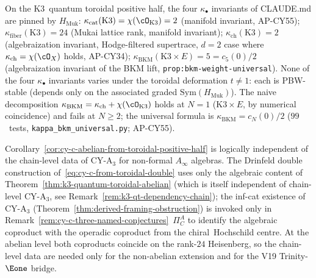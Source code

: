 \begin{remark}
\label{rem:cy-c-toroidal-kappa-spectrum}
On the K$3$~quantum toroidal positive half, the four
$\kappa_\bullet$ invariants of CLAUDE.md are pinned by
$H_{\mathrm{Muk}}$:
$\kappa_{\mathrm{cat}}(\mathrm{K}3) = \chi(\cO_{\mathrm{K}3}) = 2$
(manifold invariant, AP-CY55);
$\kappa_{\mathrm{fiber}}(\mathrm{K}3) = 24$ (Mukai lattice rank,
manifold invariant);
$\kappa_{\mathrm{ch}}(\mathrm{K}3) = 2$ (algebraization invariant,
Hodge-filtered supertrace, $d = 2$ case where
$\kappa_{\mathrm{ch}} = \chi(\cO_X)$ holds, AP-CY34);
$\kappa_{\mathrm{BKM}}(\mathrm{K}3 \times E) = 5 = c_5(0)/2$
(algebraization invariant of the BKM lift,
\texttt{prop:bkm-weight-universal}).  None of the four $\kappa_\bullet$
invariants varies under the toroidal deformation $t \neq 1$: each is
PBW-stable (depends only on the associated graded
$\mathrm{Sym}(H_{\mathrm{Muk}})$).  The naive decomposition
$\kappa_{\mathrm{BKM}} = \kappa_{\mathrm{ch}} + \chi(\cO_{\mathrm{K}3})$
holds at $N = 1$ (K$3 \times E$, by numerical coincidence) and fails at
$N \geq 2$; the universal formula is $\kappa_{\mathrm{BKM}} = c_N(0)/2$
($99$~tests, \texttt{kappa\_bkm\_universal.py}; AP-CY55).
\end{remark}

\begin{remark}
\label{rem:cor-toroidal-ca3-indep}
Corollary~\ref{cor:cy-c-abelian-from-toroidal-positive-half} is logically
independent of the chain-level data of CY-A$_3$ for non-formal
$A_\infty$ algebras.  The Drinfeld double construction
of~\eqref{eq:cy-c-from-toroidal-double} uses only the algebraic content
of Theorem~\ref{thm:k3-quantum-toroidal-abelian} (which is itself
independent of chain-level CY-A$_3$, see
Remark~\ref{rem:k3-qt-dependency-chain}); the inf-cat existence of
CY-A$_3$ (Theorem~\ref{thm:derived-framing-obstruction}) is invoked
only in Remark~\ref{rem:cy-c-three-named-conjectures}~$\Pi_C^A$ to
identify the algebraic coproduct with the operadic coproduct from the
chiral~Hochschild centre.  At the abelian level both coproducts coincide
on the rank-$24$ Heisenberg, so the chain-level data are needed only for
the non-abelian extension and for the V19 Trinity-$\Eone$ bridge.
\end{remark}


